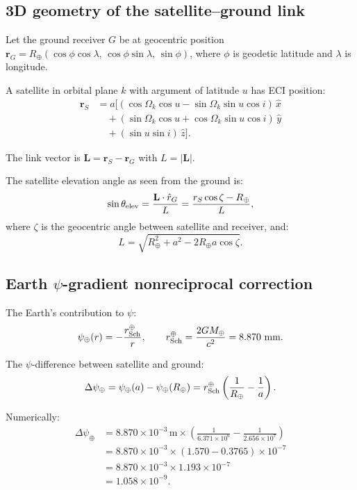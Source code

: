 \documentclass[aps,prl,twocolumn,superscriptaddress,showpacs]{revtex4-2}
\newcommand{\Mearth}{M_\oplus}
\newcommand{\Rearth}{R_\oplus}
\newcommand{\rSch}{r_{\rm Sch}}
\begin{document}
\subsection{3D geometry of the satellite--ground link}

Let the ground receiver $G$ be at geocentric position
$\mathbf{r}_G = \Rearth(\cos\phi\cos\lambda,\,\cos\phi\sin\lambda,\,\sin\phi)$,
where $\phi$ is geodetic latitude and $\lambda$ is longitude.

A satellite in orbital plane $k$ with argument of latitude $u$
has ECI position:
\begin{align}
\mathbf{r}_S &= a\bigl[
(\cos\Omega_k\cos u - \sin\Omega_k\sin u\cos i)\,\hat{x} \nonumber\\
&\quad + (\sin\Omega_k\cos u + \cos\Omega_k\sin u\cos i)\,\hat{y} \nonumber\\
&\quad + (\sin u\sin i)\,\hat{z}\bigr].
\label{eq:sat_position}
\end{align}

The link vector is $\mathbf{L} = \mathbf{r}_S - \mathbf{r}_G$
with $L = |\mathbf{L}|$.

The satellite elevation angle as seen from the ground is:
\begin{equation}
\sin\theta_{\rm elev} = \frac{\mathbf{L}\cdot\hat{r}_G}{L}
= \frac{r_S\cos\zeta - \Rearth}{L},
\end{equation}
where $\zeta$ is the geocentric angle between satellite and receiver,
and:
\begin{equation}
L = \sqrt{\Rearth^2 + a^2 - 2\Rearth a\cos\zeta}.
\end{equation}

\subsection{Earth $\psi$-gradient nonreciprocal correction}

The Earth's contribution to $\psi$:
\begin{equation}
\psi_\oplus(r) = -\frac{\rSch^\oplus}{r}, \qquad
\rSch^\oplus = \frac{2G\Mearth}{c^2} = 8.870~\text{mm}.
\end{equation}

The $\psi$-difference between satellite and ground:
\begin{equation}
\Delta\psi_\oplus = \psi_\oplus(a) - \psi_\oplus(\Rearth)
= \rSch^\oplus\left(\frac{1}{\Rearth} - \frac{1}{a}\right).
\end{equation}

Numerically:
\begin{align}
\Delta\psi_\oplus &= 8.870\times 10^{-3}\,\text{m}
\times\left(\frac{1}{6.371\times 10^6} - \frac{1}{2.656\times 10^7}\right) \nonumber\\
&= 8.870\times 10^{-3}\times(1.570 - 0.3765)\times 10^{-7} \nonumber\\
&= 8.870\times 10^{-3}\times 1.193\times 10^{-7} \nonumber\\
&= 1.058\times 10^{-9}.
\label{eq:delta_psi_earth}
\end{align}
\end{document}
